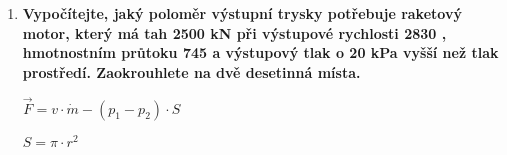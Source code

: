 \documentclass[../main.tex]{subfiles}
\begin{document}
\begin{enumerate}[label={\textbf{\arabic*.}}, resume]
    \item \textbf{Vypočítejte, jaký poloměr výstupní trysky potřebuje raketový motor, který má tah 2500 kN při výstupové rychlosti 2830 \ms, hmotnostním průtoku 745 \kgs a výstupový tlak o 20 kPa vyšší než tlak prostředí. Zaokrouhlete na dvě desetinná místa.}
    \vspace{-0.75cm}
    \begin{flushright}
        \begin{minipage}{0.29\textwidth}
            \begin{tcolorbox}[colframe=black, colback=white, boxrule=0.6pt]
                {$\vec{F}=v\cdot{\dot{m}-(p_1-p_2)\cdot{S}}$}
            \end{tcolorbox}
        \end{minipage}
        \begin{minipage}{0.14\textwidth}
            \begin{tcolorbox}[colframe=black, colback=white, boxrule=0.6pt]
                {$S=\pi\cdot{r^2}$}
            \end{tcolorbox}
        \end{minipage}
    \end{flushright}
    \vfill
    
\end{enumerate}
\end{document}
